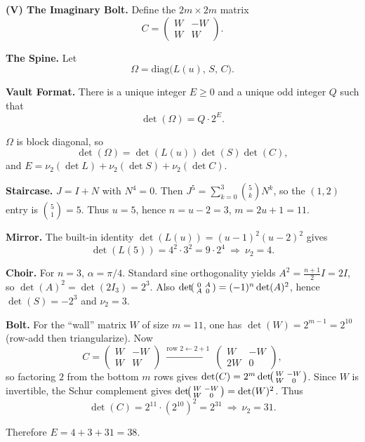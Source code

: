 \noindent\textbf{(V) The Imaginary Bolt.}
Define the \(2m\times 2m\) matrix
\[
C=\begin{pmatrix}
W&-W\\
W&W
\end{pmatrix}.
\]

\noindent\textbf{The Spine.}
Let
\[
\Omega=\mathrm{diag}\bigl(L(u),\,S,\,C\bigr).
\]

\noindent\textbf{Vault Format.}
There is a unique integer \(E\ge 0\) and a unique odd integer \(Q\) such that
\[
\det(\Omega)=Q\cdot 2^{E}.
\]


\SolutionPage
\(\Omega\) is block diagonal, so
\[
\det(\Omega)=\det(L(u))\det(S)\det(C),
\]
and \(E=\nu_2(\det L)+\nu_2(\det S)+\nu_2(\det C)\).

\smallskip
\textbf{Staircase.} \(J=I+N\) with \(N^4=0\). Then \(J^5=\sum_{k=0}^3\binom{5}{k}N^k\), so the \((1,2)\) entry is \(\binom51=5\). Thus \(u=5\), hence \(n=u-2=3\), \(m=2u+1=11\).

\smallskip
\textbf{Mirror.} The built-in identity \(\det(L(u))=(u-1)^2(u-2)^2\) gives
\[
\det(L(5))=4^2\cdot 3^2=9\cdot 2^4\ \Rightarrow\ \nu_2=4.
\]

\smallskip
\textbf{Choir.} For \(n=3\), \(\alpha=\pi/4\). Standard sine orthogonality yields \(A^2=\frac{n+1}{2}I=2I\), so \(\det(A)^2=\det(2I_3)=2^3\).
Also \(\det\!\begin{psmallmatrix}0&A\\A&0\end{psmallmatrix}=(-1)^n\det(A)^2\), hence \(\det(S)=-2^3\) and \(\nu_2=3\).

\smallskip
\textbf{Bolt.} For the “wall” matrix \(W\) of size \(m=11\), one has \(\det(W)=2^{m-1}=2^{10}\) (row-add then triangularize).
Now
\[
C=\begin{pmatrix}W&-W\\W&W\end{pmatrix}\ \xrightarrow{\text{row }2\leftarrow 2+1}\
\begin{pmatrix}W&-W\\2W&0\end{pmatrix},
\]
so factoring \(2\) from the bottom \(m\) rows gives \(\det(C)=2^{m}\det\!\begin{psmallmatrix}W&-W\\W&0\end{psmallmatrix}\).
Since \(W\) is invertible, the Schur complement gives \(\det\!\begin{psmallmatrix}W&-W\\W&0\end{psmallmatrix}=\det(W)^2\).
Thus
\[
\det(C)=2^{11}\cdot (2^{10})^2=2^{31}\ \Rightarrow\ \nu_2=31.
\]

Therefore \(E=4+3+31=38\).


\NextPage

